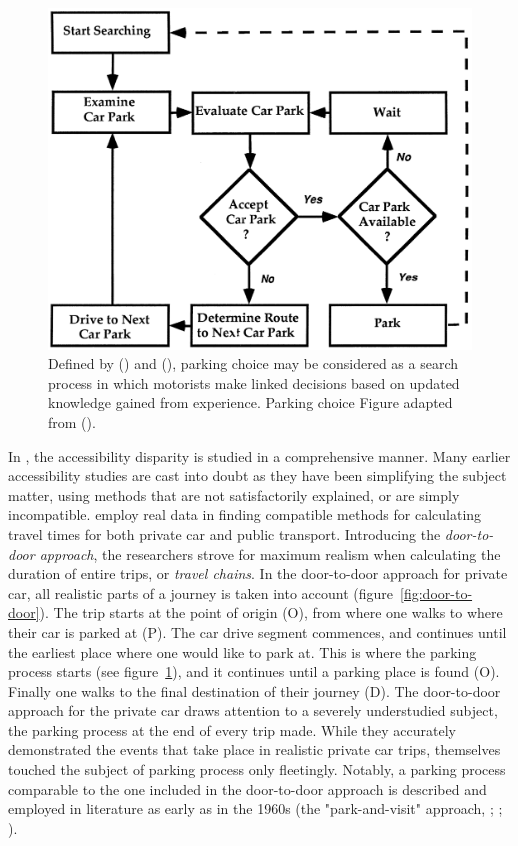 \begin{figure}[H]%
    \centering
    \includegraphics[width=.75\textwidth]{images/thesis_parking_search_process_thompson1998.PNG}
    \caption[Parking search process]{Defined by \citeauthor{Layzell1985} (\citeyear{Layzell1985}) and \citeauthor{Polak1989} (\citeyear{Polak1989}), parking choice may be considered as a search process in which motorists make linked decisions based on updated knowledge gained from experience. Parking choice Figure adapted from \citeauthor{Thompson1998} (\citeyear{Thompson1998}).}%
    \label{fig:parking-process-thompson}%
\end{figure}

In , the accessibility disparity is studied in a comprehensive manner. Many earlier accessibility studies are cast into doubt as they have been simplifying the subject matter, using methods that are not satisfactorily explained, or are simply incompatible. \citeauthor{Salonen2013} employ real data in finding compatible methods for calculating travel times for both private car and public transport. Introducing the \textit{door-to-door approach}, the researchers strove for maximum realism when calculating the duration of entire trips, or \textit{travel chains}. In the door-to-door approach for private car, all realistic parts of a journey is taken into account (figure~\ref{fig:door-to-door}). The trip starts at the point of origin (O), from where one walks to where their car is parked at (P). The car drive segment commences, and continues until the earliest place where one would like to park at. This is where the parking process starts (see figure~\ref{fig:parking-process-thompson}), and it continues until a parking place is found (O). Finally one walks to the final destination of their journey (D). The door-to-door approach for the private car draws attention to a severely understudied subject, the parking process at the end of every trip made. While they accurately demonstrated the events that take place in realistic private car trips, \citeauthor{Salonen2013} themselves touched the subject of parking process only fleetingly. Notably, a parking process comparable to the one included in the door-to-door approach is described and employed in literature as early as in the 1960s (the "park-and-visit" approach, \cite{Inwood1966}; \cite{May1985}; \cite{Belloche2015}). 

